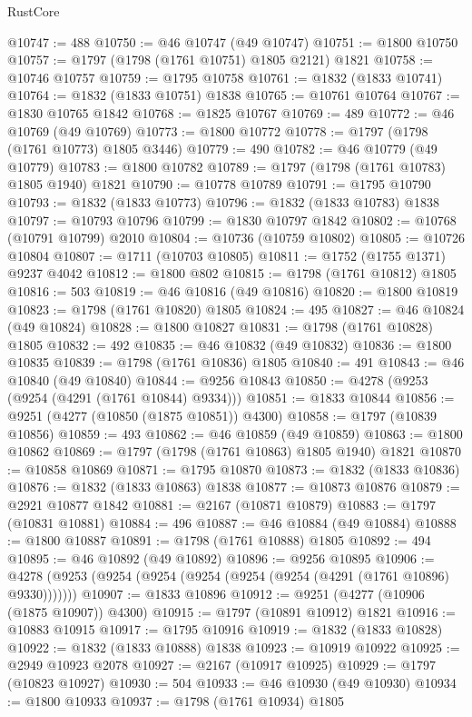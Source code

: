 \begin{lexlean}{RustCore}
\begin{coremodule}
@10747 := 488
@10750 := @46 @10747 (@49 @10747)
@10751 := @1800 @10750
@10757 := @1797 (@1798 (@1761 @10751) @1805 @2121) @1821
@10758 := @10746 @10757
@10759 := @1795 @10758
@10761 := @1832 (@1833 @10741)
@10764 := @1832 (@1833 @10751) @1838
@10765 := @10761 @10764
@10767 := @1830 @10765 @1842
@10768 := @1825 @10767
@10769 := 489
@10772 := @46 @10769 (@49 @10769)
@10773 := @1800 @10772
@10778 := @1797 (@1798 (@1761 @10773) @1805 @3446)
@10779 := 490
@10782 := @46 @10779 (@49 @10779)
@10783 := @1800 @10782
@10789 := @1797 (@1798 (@1761 @10783) @1805 @1940) @1821
@10790 := @10778 @10789
@10791 := @1795 @10790
@10793 := @1832 (@1833 @10773)
@10796 := @1832 (@1833 @10783) @1838
@10797 := @10793 @10796
@10799 := @1830 @10797 @1842
@10802 := @10768 (@10791 @10799) @2010
@10804 := @10736 (@10759 @10802)
@10805 := @10726 @10804
@10807 := @1711 (@10703 @10805)
@10811 := @1752 (@1755 @1371) @9237 @4042
@10812 := @1800 @802
@10815 := @1798 (@1761 @10812) @1805
@10816 := 503
@10819 := @46 @10816 (@49 @10816)
@10820 := @1800 @10819
@10823 := @1798 (@1761 @10820) @1805
@10824 := 495
@10827 := @46 @10824 (@49 @10824)
@10828 := @1800 @10827
@10831 := @1798 (@1761 @10828) @1805
@10832 := 492
@10835 := @46 @10832 (@49 @10832)
@10836 := @1800 @10835
@10839 := @1798 (@1761 @10836) @1805
@10840 := 491
@10843 := @46 @10840 (@49 @10840)
@10844 := @9256 @10843
@10850 := @4278 (@9253 (@9254 (@4291 (@1761 @10844) @9334)))
@10851 := @1833 @10844
@10856 := @9251 (@4277 (@10850 (@1875 @10851)) @4300)
@10858 := @1797 (@10839 @10856)
@10859 := 493
@10862 := @46 @10859 (@49 @10859)
@10863 := @1800 @10862
@10869 := @1797 (@1798 (@1761 @10863) @1805 @1940) @1821
@10870 := @10858 @10869
@10871 := @1795 @10870
@10873 := @1832 (@1833 @10836)
@10876 := @1832 (@1833 @10863) @1838
@10877 := @10873 @10876
@10879 := @2921 @10877 @1842
@10881 := @2167 (@10871 @10879)
@10883 := @1797 (@10831 @10881)
@10884 := 496
@10887 := @46 @10884 (@49 @10884)
@10888 := @1800 @10887
@10891 := @1798 (@1761 @10888) @1805
@10892 := 494
@10895 := @46 @10892 (@49 @10892)
@10896 := @9256 @10895
@10906 := @4278 (@9253 (@9254 (@9254 (@9254 (@9254 (@9254 (@4291 (@1761 @10896) @9330)))))))
@10907 := @1833 @10896
@10912 := @9251 (@4277 (@10906 (@1875 @10907)) @4300)
@10915 := @1797 (@10891 @10912) @1821
@10916 := @10883 @10915
@10917 := @1795 @10916
@10919 := @1832 (@1833 @10828)
@10922 := @1832 (@1833 @10888) @1838
@10923 := @10919 @10922
@10925 := @2949 @10923 @2078
@10927 := @2167 (@10917 @10925)
@10929 := @1797 (@10823 @10927)
@10930 := 504
@10933 := @46 @10930 (@49 @10930)
@10934 := @1800 @10933
@10937 := @1798 (@1761 @10934) @1805

\end{coremodule}
\end{lexlean}
